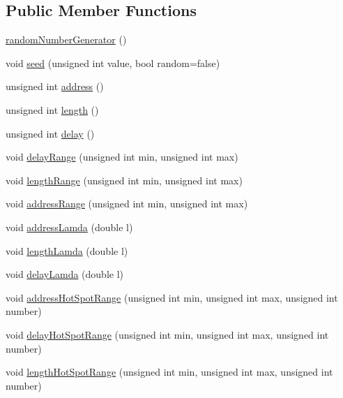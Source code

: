 \begin{CompactItemize}
\subsection*{Public Member Functions}
\begin{CompactItemize}
\item 
\hyperlink{classlibRandom_1_1randomNumberGenerator_51655653697a9179d26c0059bf4581ba}{randomNumberGenerator} ()
\item 
void \hyperlink{classlibRandom_1_1randomNumberGenerator_00143c7923d43f02088e9e7055114534}{seed} (unsigned int value, bool random=false)
\item 
unsigned int \hyperlink{classlibRandom_1_1randomNumberGenerator_4adc688e3551a76d63bd5d5d83e2416e}{address} ()
\item 
unsigned int \hyperlink{classlibRandom_1_1randomNumberGenerator_5b360c7a906759126af0c3448c55665c}{length} ()
\item 
unsigned int \hyperlink{classlibRandom_1_1randomNumberGenerator_5bb117331bfebed3e79cc053ea5825f7}{delay} ()
\item 
void \hyperlink{classlibRandom_1_1randomNumberGenerator_9294756c2fadecd72dae9ac8bef46ed8}{delayRange} (unsigned int min, unsigned int max)
\item 
void \hyperlink{classlibRandom_1_1randomNumberGenerator_89781d80f95a9dee3cba6e0833b711f5}{lengthRange} (unsigned int min, unsigned int max)
\item 
void \hyperlink{classlibRandom_1_1randomNumberGenerator_60fc099a5657350b9b0a176fbea5af33}{addressRange} (unsigned int min, unsigned int max)
\item 
void \hyperlink{classlibRandom_1_1randomNumberGenerator_a14eb74994240473cc7670cf34d2890a}{addressLamda} (double l)
\item 
void \hyperlink{classlibRandom_1_1randomNumberGenerator_6d64b08e866628293422187ee4c91ce5}{lengthLamda} (double l)
\item 
void \hyperlink{classlibRandom_1_1randomNumberGenerator_0827267ed2292a67fa14d77be35b58bc}{delayLamda} (double l)
\item 
void \hyperlink{classlibRandom_1_1randomNumberGenerator_57d06cd2af1eaac82bec9d1d1ed24f46}{addressHotSpotRange} (unsigned int min, unsigned int max, unsigned int number)
\item 
void \hyperlink{classlibRandom_1_1randomNumberGenerator_c1a9329975b50675d340ffd4d788a794}{delayHotSpotRange} (unsigned int min, unsigned int max, unsigned int number)
\item 
void \hyperlink{classlibRandom_1_1randomNumberGenerator_37e8d447168cfeb82a0256ea69dfdd26}{lengthHotSpotRange} (unsigned int min, unsigned int max, unsigned int number)

\end{CompactItemize}
\end{CompactItemize}
